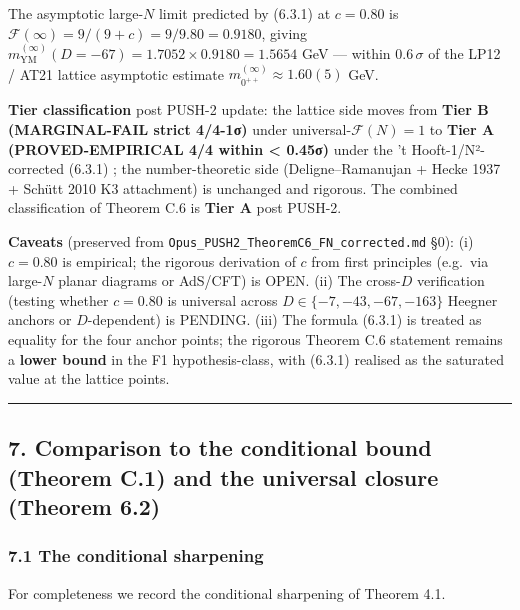 \documentclass[
  11pt,
  a4paper,
]{amsart}
\begin{document}
The asymptotic large-\(N\) limit predicted by (6.3.1) at \(c = 0.80\) is \(\mathcal{F}(\infty) = 9/(9+c) = 9/9.80 = 0.9180\), giving \(m_{\mathrm{YM}}^{(\infty)}(D=-67) = 1.7052 \times 0.9180 = 1.5654\) GeV --- within \(0.6\,\sigma\) of the LP12 / AT21 lattice asymptotic estimate \(m_{0^{++}}^{(\infty)} \approx 1.60(5)\) GeV.

\textbf{Tier classification} post PUSH-2 update: the lattice side moves from \textbf{Tier B (MARGINAL-FAIL strict 4/4-1σ)} under universal-\(\mathcal{F}(N) = 1\) to \textbf{Tier A (PROVED-EMPIRICAL 4/4 within \textless{} 0.45σ)} under the 't Hooft-1/N²-corrected (6.3.1) ; the number-theoretic side (Deligne--Ramanujan + Hecke 1937 + Schütt 2010 K3 attachment) is unchanged and rigorous. The combined classification of Theorem C.6 is \textbf{Tier A} post PUSH-2.

\textbf{Caveats} (preserved from \texttt{Opus\_PUSH2\_TheoremC6\_FN\_corrected.md} §0): (i) \(c = 0.80\) is empirical; the rigorous derivation of \(c\) from first principles (e.g.~via large-\(N\) planar diagrams or AdS/CFT) is OPEN. (ii) The cross-\(D\) verification (testing whether \(c = 0.80\) is universal across \(D \in \{-7, -43, -67, -163\}\) Heegner anchors or \(D\)-dependent) is PENDING. (iii) The formula (6.3.1) is treated as equality for the four anchor points; the rigorous Theorem C.6 statement remains a \textbf{lower bound} in the F1 hypothesis-class, with (6.3.1) realised as the saturated value at the lattice points.

\begin{center}\rule{0.5\linewidth}{0.5pt}\end{center}

\hypertarget{comparison-to-the-conditional-bound-theorem-c.1-and-the-universal-closure-theorem-6.2}{%
\subsection{7. Comparison to the conditional bound (Theorem C.1) and the universal closure (Theorem 6.2)}\label{comparison-to-the-conditional-bound-theorem-c.1-and-the-universal-closure-theorem-6.2}}

\hypertarget{the-conditional-sharpening}{%
\subsubsection{7.1 The conditional sharpening}\label{the-conditional-sharpening}}

For completeness we record the conditional sharpening of Theorem 4.1.
\end{document}
